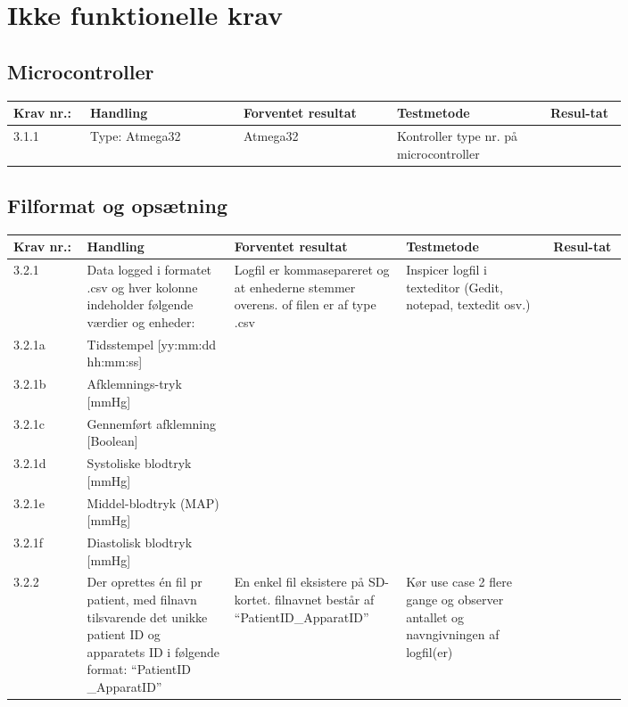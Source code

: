 \chapter{Ikke funktionelle krav}
			\section{Microcontroller}
				\begin{longtable}{|p{0.1\linewidth}|p{0.2\linewidth}|p{0.2\linewidth}|p{0.2\linewidth}|p{0.1\linewidth}|}
					\hline
					\rowcolor{usDef}
					Krav nr.: & Handling & Forventet resultat & Testmetode & Resul-tat  \\\hline
					 3.1.1 & Type: Atmega32 & Atmega32 & Kontroller type nr. på microcontroller & \\ \hline
				\end{longtable}
			
			\section{Filformat og opsætning}
				\begin{longtable}{|p{0.1\linewidth}|p{0.2\linewidth}|p{0.2\linewidth}|p{0.2\linewidth}|p{0.1\linewidth}|}
					\hline
					\rowcolor{usDef}
					Krav nr.: & Handling & Forventet resultat & Testmetode & Resul-tat  \\\hline
					3.2.1 & Data logged i formatet .csv og hver kolonne indeholder følgende værdier og enheder:  & \multirow{7}{\linewidth}{Logfil er kommasepareret og at enhederne stemmer overens. of filen er af type .csv }&  \multirow{7}{\linewidth}{Inspicer logfil i texteditor (Gedit, notepad, textedit osv.)}& \multirow{7}{\linewidth}{} \\ \cline{1-2}
					3.2.1a& Tidsstempel [yy:mm:dd hh:mm:ss] & &  & \\ \cline{1-2}
					3.2.1b& Afklemnings-tryk [mmHg] & &  & \\ \cline{1-2}
					3.2.1c&  Gennemført afklemning [Boolean] & &  & \\ \cline{1-2}
					3.2.1d&  Systoliske blodtryk [mmHg] & &  & \\ \cline{1-2}
					3.2.1e&  Middel-blodtryk (MAP) [mmHg] & &  & \\ \cline{1-2}
					3.2.1f&  Diastolisk blodtryk [mmHg]  & &  & \\ \hline
					3.2.2 & Der oprettes én fil pr patient, med filnavn tilsvarende det unikke patient ID og apparatets ID i følgende format: “PatientID \_ApparatID”  & En enkel fil eksistere på SD-kortet. filnavnet består af “PatientID\_ApparatID” & Kør use case 2 flere gange og observer antallet og navngivningen af logfil(er)  & \\ \hline
				\end{longtable}
			
